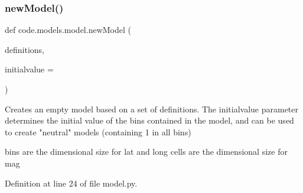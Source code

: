\subsubsection{\texorpdfstring{new\+Model()}{newModel()}}
{\footnotesize\ttfamily def code.\+models.\+model.\+new\+Model (\begin{DoxyParamCaption}\item[{}]{definitions,  }\item[{}]{initialvalue = {} }\end{DoxyParamCaption})}

\begin{DoxyVerb}Creates an empty model based on a set of definitions. 
The initialvalue parameter determines the initial value of 
the bins contained in the model, and can be used to create 
"neutral" models (containing 1 in all bins)

bins are the dimensional size for lat and long
cells are the dimensional size for mag
\end{DoxyVerb}
 

Definition at line 24 of file model.\+py.

